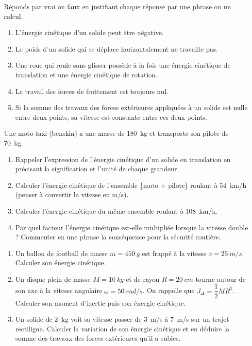 \documentclass[11pt]{article}
\begin{document}
\begin{exercice}
Réponds par vrai ou faux en justifiant chaque réponse par une phrase ou un calcul.
\begin{enumerate}
\item L'énergie cinétique d'un solide peut être négative.
\item Le poids d'un solide qui se déplace horizontalement ne travaille pas.
\item Une roue qui roule sans glisser possède à la fois une énergie cinétique de translation et une énergie cinétique de rotation.
\item Le travail des forces de frottement est toujours nul.
\item Si la somme des travaux des forces extérieures appliquées à un solide est nulle entre deux points, sa vitesse est constante entre ces deux points.
\end{enumerate}
\end{exercice}

\begin{exercice}
Une moto-taxi (benskin) a une masse de \SI{180}{kg} et transporte son pilote de \SI{70}{kg}.
\begin{enumerate}
\item Rappeler l'expression de l'énergie cinétique d'un solide en translation en précisant la signification et l'unité de chaque grandeur.
\item Calculer l'énergie cinétique de l'ensemble \{moto + pilote\} roulant à \SI{54}{km/h} (penser à convertir la vitesse en m/s).
\item Calculer l'énergie cinétique du même ensemble roulant à \SI{108}{km/h}.
\item Par quel facteur l'énergie cinétique est-elle multipliée lorsque la vitesse double ? Commenter en une phrase la conséquence pour la sécurité routière.
\end{enumerate}
\end{exercice}

\begin{exercice}
\begin{enumerate}
\item Un ballon de football de masse $m = \SI{450}{g}$ est frappé à la vitesse $v = \SI{25}{m/s}$. Calculer son énergie cinétique.
\item Un disque plein de masse $M = \SI{10}{kg}$ et de rayon $R = \SI{20}{cm}$ tourne autour de son axe à la vitesse angulaire $\omega = \SI{50}{rad/s}$. On rappelle que $J_{\Delta} = \dfrac{1}{2}MR^2$. Calculer son moment d'inertie puis son énergie cinétique.
\item Un solide de \SI{2}{kg} voit sa vitesse passer de \SI{3}{m/s} à \SI{7}{m/s} sur un trajet rectiligne. Calculer la variation de son énergie cinétique et en déduire la somme des travaux des forces extérieures qu'il a subies.
\end{enumerate}
\end{exercice}
\end{document}
